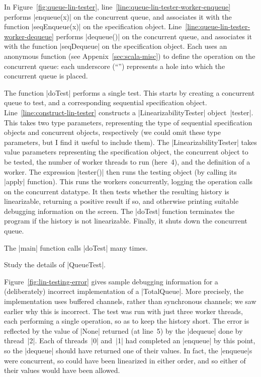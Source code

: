 In Figure~\ref{fig:queue-lin-tester},
line~\ref{line:queue-lin-tester-worker-enqueue} performs |enqueue(x)| on the
concurrent queue, and associates it with the function |seqEnqueue(x)| on the
specification object.  Line~\ref{line:queue-lin-tester-worker-dequeue}
performs |dequeue()| on the concurrent queue, and associates it with the
function |seqDequeue| on the specification object.  Each uses an anonymous
function (see Appenix~\ref{sec:scala-misc}) to define the operation on the
concurrent queue: each underscore (``\SCALA{_}'') represents a hole into which
the concurrent queue is placed.

The function |doTest| performs a single test.  This starts by creating a
concurrent queue to test, and a corresponding sequential specification object.
Line~\ref{line:construct-lin-tester} constructs a
|LinearizabilityTester|
object~|tester|.  This takes two type parameters, representing the type of
sequential specification objects and concurrent objects, respectively (we
could omit these type parameters, but I find it useful to include them).  The
|LinearizabilityTester| takes value parameters representing the specification
object, the concurrent object to be tested, the number of worker threads to
run (here~4), and the definition of a worker.
%
The expression |tester()| then runs the testing object (by calling its |apply|
function).  This runs the workers concurrently, logging the operation calls on
the concurrent datatype.  It then tests whether the resulting history is
linearizable, returning a positive result if so, and otherwise printing
suitable debugging information on the screen.  The |doTest| function
terminates the program if the history is not linearizable.  Finally, it shuts
down the concurrent queue.

The |main| function calls |doTest| many times. 

\begin{instruction}
Study the details of |QueueTest|.
\end{instruction}

Figure~\ref{fig:lin-testing-error} gives sample debugging information for a
(deliberately) incorrect implementation of a |TotalQueue|.  More precisely,
the implementation uses buffered channels, rather than synchronous channels;
we saw earlier why this is incorrect.  The test was run with just three worker
threads, each performing a single operation, so as to keep the history short.
The error is reflected by the value of |None| returned (at line~5) by the
|dequeue| done by thread~|2|.  Each of threads~|0| and~|1| had completed an
|enqueue| by this point, so the |dequeue| should have returned one of their
values.  In fact, the |enqueue|s were concurrent, so could have been
linearized in either order, and so either of their values would have been
allowed.

